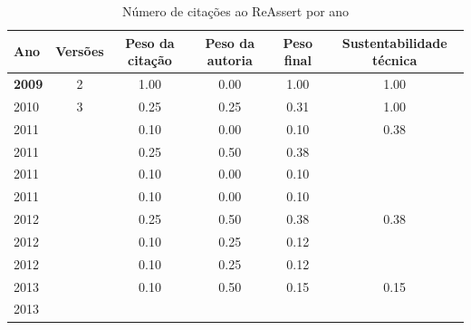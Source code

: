 \begin{table}[H]
\caption{Número de citações ao ReAssert por ano}
\centering
\begin{tabular}{| l | c | c | c | c | c |}
  \hline
  Ano & Versões & Peso da citação & Peso da autoria & Peso final & Sustentabilidade técnica \\
  \hline
            {\bf 2009}
          &
          2
          &
          1.00
          &
          0.00
          &
          1.00
          &
            {\color{blue} 1.00}
          \\
\hline
            2010
          &
          3
          &
          0.25
          &
          0.25
          &
          0.31
          &
            {\color{blue} 1.00}
          \\
\hline
            2011
          &
          
          &
          0.10
          &
          0.00
          &
          0.10
          &
            {\color{red} 0.38}
          \\
            2011
          &
          
          &
          0.25
          &
          0.50
          &
          0.38
          &
          \\
            2011
          &
          
          &
          0.10
          &
          0.00
          &
          0.10
          &
          \\
            2011
          &
          
          &
          0.10
          &
          0.00
          &
          0.10
          &
          \\
\hline
            2012
          &
          
          &
          0.25
          &
          0.50
          &
          0.38
          &
            {\color{red} 0.38}
          \\
            2012
          &
          
          &
          0.10
          &
          0.25
          &
          0.12
          &
          \\
            2012
          &
          
          &
          0.10
          &
          0.25
          &
          0.12
          &
          \\
\hline
            2013
          &
          
          &
          0.10
          &
          0.50
          &
          0.15
          &
            {\color{red} 0.15}
          \\
            2013
          &
          

\end{tabular}
\end{table}
